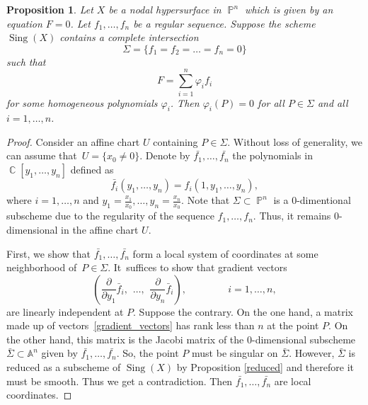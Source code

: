 \documentclass[a4paper,11pt,english,german]{amsart}
\DeclareMathOperator{\IP}{\mathbb{P}}
\DeclareMathOperator{\C}{\mathbb{C}}
\DeclareMathOperator{\Sing}{Sing}
\newtheorem{prop}[thm]{Proposition}
\theoremstyle{definition}
\begin{document}
\begin{prop}\label{local_coordinates_and_nodes}
	Let $X$ be a nodal hypersurface in $\IP^n$ which is given by an equation $F=0$. Let $f_1,\dots,f_n$ be a regular sequence. Suppose the scheme $\Sing(X)$ contains a complete intersection 
	$$\Sigma= \{f_1=f_2=\dots= f_n=0\}$$
	 such that $$F=\sum\limits_{i=1}^n \varphi_i f_i$$ for some homogeneous polynomials $\varphi_i$. Then $\varphi_i(P)=0$ for all $P\in \Sigma$ and all $i=1,\dots,n$.
\end{prop}
\begin{proof}
	Consider an affine chart $U$ containing $P\in \Sigma$. Without loss of generality, we can assume that~$U=\{x_0\neq 0\}$. Denote by
$\bar{f_1}, \dots, \bar{f_n}$ the polynomials in $\C[y_1,\dots,y_n]$ defined as
$$\bar{f_i}(y_1,\dots,y_n)=f_i(1,y_1,\dots,y_n),$$
where $i=1,\dots,n$ and $y_1=\frac{x_1}{x_0},\dots, y_n=\frac{x_n}{x_0}$. Note that $\Sigma\subset \IP^n$ is a 0-dimentional subscheme due to the regularity of the sequence $f_1,\dots,f_n$. Thus, it remains 0-dimensional in the affine chart $U$.

First, we show that $\bar{f_1},\dots,\bar{f_n}$ form a local system of coordinates at some neighborhood of~$P\in \Sigma$. It~suffices to show that gradient vectors 
\begin{equation*}\label{gradient_vectors}\tag{5.4}
(\frac{\partial }{\partial y_1}\bar{f}_i, \hspace{5pt} \dots, \hspace{5pt} \frac{\partial }{\partial y_n}\bar{f}_i), \hspace{50pt}i=1,\dots,n,	
\end{equation*}
are linearly independent at $P$. Suppose the contrary. On the one hand, a matrix made up of vectors~\eqref{gradient_vectors} has rank less than $n$ at the point $P$. On the other hand, this matrix is the Jacobi matrix of the 0-dimensional subscheme $\bar{\Sigma}\subset \mathbb{A}^n$ given by $\bar{f_1},\dots, \bar{f_n}$. So, the point $P$ must be singular on $\bar{\Sigma}$. However, $\bar{\Sigma}$ is reduced as a subscheme of $\Sing(X)$ by Proposition \ref{reduced} and therefore it must be smooth. Thus we get a contradiction. Then $\bar{f_1}, \dots, \bar{f_n}$ are local coordinates.



\end{proof}
\end{document}
